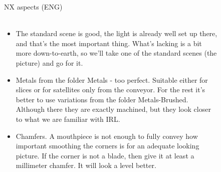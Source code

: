 \documentclass[aspectratio=169]{beamer}
\begin{document}
\begin{frame}[t]{NX aspects (ENG)}
    \framesubtitle{}
    \begin{columns}[T,onlytextwidth]
        \begin{column}{0.69\textwidth}
            \begin{itemize}
                \scriptsize
                \item The standard scene is good, the light is already well set up there, and that's the most important thing. What's lacking is a bit more down-to-earth, so we'll take one of the standard scenes (the picture) and go for it.
                \item Metals from the folder Metals - too perfect. Suitable either for slices or for satellites only from the conveyor. For the rest it's better to use variations from the folder Metals-Brushed. Although there they are exactly machined, but they look closer to what we are familiar with IRL.
                \item Chamfers. A mouthpiece is not enough to fully convey how important smoothing the corners is for an adequate looking picture. If the corner is not a blade, then give it at least a millimeter chamfer. It will look a level better.
            \end{itemize}
        \end{column}
        \begin{column}{0.29\textwidth}
            \begin{figure}[H]
                \centering\includegraphics[height=5.5cm,width=1\textwidth,keepaspectratio]{standard_scence.jpg}
                \label{fig:standard_scence.jpg}
            \end{figure}
        \end{column}
    \end{columns}
    \end{frame}
\end{document}
